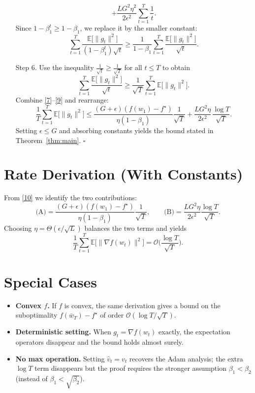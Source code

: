 \documentclass{article}
\newcommand{\EE}{\mathbb{E}}
\begin{document}
\begin{enumerate}
\[+\frac{L G^{2}\eta^{2}}{2\epsilon^{2}}\sum_{t=1}^{T}\frac{1}{t}.
\tag{7}
\]
Since $1-\beta_1^{t}\ge 1-\beta_1$, we replace it by the smaller constant:
\[
\sum_{t=1}^{T}\frac{\EE\!\big[\|g_t\|^{2}\big]}{(1-\beta_1^{t})\sqrt{t}}
\ge
\frac{1}{1-\beta_1}\sum_{t=1}^{T}\frac{\EE\!\big[\|g_t\|^{2}\big]}{\sqrt{t}}.
\tag{8}
\]
\item[Step 6.] Use the inequality $\frac{1}{\sqrt{t}}\ge\frac{1}{\sqrt{T}}$ for all $t\le T$ to obtain
\[
\sum_{t=1}^{T}\frac{\EE\!\big[\|g_t\|^{2}\big]}{\sqrt{t}}
\ge
\frac{1}{\sqrt{T}}\sum_{t=1}^{T}\EE\!\big[\|g_t\|^{2}\big].
\tag{9}
\]
Combine \eqref{7}–\eqref{9} and rearrange:
\[
\frac{1}{T}\sum_{t=1}^{T}\EE\!\big[\|g_t\|^{2}\big]
\le
\frac{(G+\epsilon)(f(w_1)-f^\star)}{\eta(1-\beta_1)}\frac{1}{\sqrt{T}}
+\frac{L G^{2}\eta}{2\epsilon^{2}}\,\frac{\log T}{\sqrt{T}}.
\tag{10}
\]
Setting $\epsilon\le G$ and absorbing constants yields the bound stated in
Theorem~\ref{thm:main}. \hfill $\square$
\end{enumerate}

\section*{Rate Derivation (With Constants)}
From \eqref{10} we identify the two contributions:
\[
\text{(A)}=\frac{(G+\epsilon)(f(w_1)-f^\star)}{\eta(1-\beta_1)}\frac{1}{\sqrt{T}},
\qquad
\text{(B)}=\frac{L G^{2}\eta}{2\epsilon^{2}}\frac{\log T}{\sqrt{T}}.
\]
Choosing $\eta=\Theta(\epsilon/\sqrt{L})$ balances the two terms and yields
\[
\frac{1}{T}\sum_{t=1}^{T}\EE\!\big[\|\nabla f(w_t)\|^{2}\big]
= \mathcal O\!\Big(\frac{\log T}{\sqrt{T}}\Big).
\]

\section*{Special Cases}
\begin{itemize}
\item \textbf{Convex $f$.} If $f$ is convex, the same derivation gives a bound on the
suboptimality $f(\bar w_T)-f^\star$ of order $\mathcal O(\log T/\sqrt{T})$.
\item \textbf{Deterministic setting.} When $g_t=\nabla f(w_t)$ exactly,
the expectation operators disappear and the bound holds almost surely.
\item \textbf{No max operation.} Setting $\hat v_t=v_t$ recovers the Adam analysis;
the extra $\log T$ term disappears but the proof requires the stronger
assumption $\beta_1<\beta_2$ (instead of $\beta_1<\sqrt{\beta_2}$).
\end{itemize}
\end{document}
